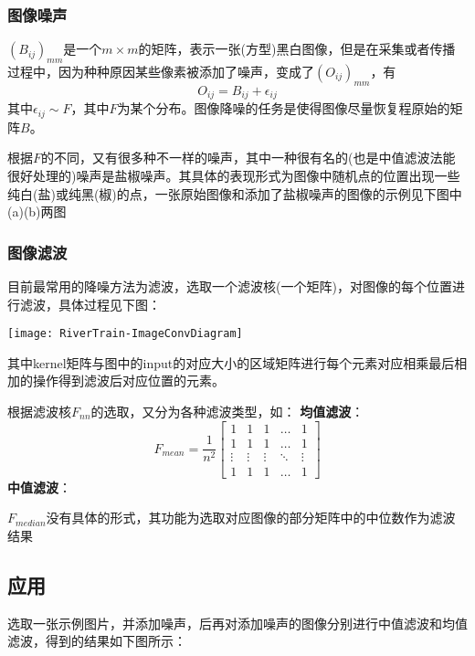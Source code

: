 \documentclass[UTF8]{article}
\begin{document}
	\subsubsection{图像噪声}	
	$(B_{ij})_{mm}$是一个$m\times m$的矩阵，表示一张(方型)黑白图像，但是在采集或者传播过程中，因为种种原因某些像素被添加了噪声，变成了$(O_{ij})_{mm}$，有
	$$O_{ij} = B_{ij} + \epsilon_{ij}$$
	其中$\epsilon_{ij} \sim F$，其中$F$为某个分布。图像降噪的任务是使得图像尽量恢复程原始的矩阵$B$。
	
	\bigbreak
	根据$F$的不同，又有很多种不一样的噪声，其中一种很有名的(也是中值滤波法能很好处理的)噪声是盐椒噪声。其具体的表现形式为图像中随机点的位置出现一些纯白(盐)或纯黑(椒)的点，一张原始图像和添加了盐椒噪声的图像的示例见下图中(a)(b)两图
	
	\subsubsection{图像滤波}
	目前最常用的降噪方法为滤波，选取一个滤波核(一个矩阵)，对图像的每个位置进行滤波，具体过程见下图：
	
	\texttt{[image: RiverTrain-ImageConvDiagram]}
	
	其中kernel矩阵与图中的input的对应大小的区域矩阵进行每个元素对应相乘最后相加的操作得到滤波后对应位置的元素。

	根据滤波核$F_{nn}$的选取，又分为各种滤波类型，如：
	\bigbreak
	\textbf{均值滤波}：
	$$
	F_{mean} = \frac1{n^2}
	\begin{bmatrix}
		1 & 1 & 1 & \dots  & 1 \\
		1 & 1 & 1 & \dots  & 1 \\
		\vdots & \vdots & \vdots & \ddots & \vdots \\
		1 & 1 & 1 & \dots  & 1
	\end{bmatrix}
	$$
	\bigbreak
	\textbf{中值滤波}：
	
	$F_{median}$没有具体的形式，其功能为选取对应图像的部分矩阵中的中位数作为滤波结果
	
	\subsection{应用}
	选取一张示例图片，并添加噪声，后再对添加噪声的图像分别进行中值滤波和均值滤波，得到的结果如下图所示：
	\bigbreak
	\begin{figure}[h]
		
		\quad
		\\
		\quad
	\end{figure}
\end{document}

